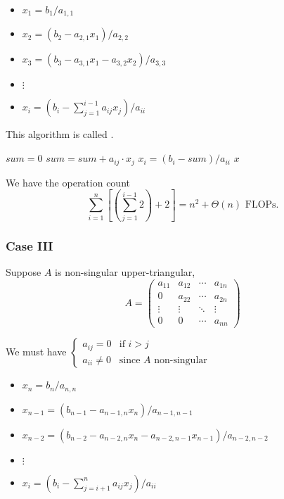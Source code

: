 \begin{itemize}
    \item \( x_1 = b_1 / a_{1,1} \)
    \item \( x_2 = (b_2 - a_{2,1} x_1) / a_{2,2} \)
    \item \( x_3 = (b_3 - a_{3,1} x_1 - a_{3,2} x_2) / a_{3,3} \)
    \item \( \vdots \)
    \item \( \displaystyle x_i = \left( b_i - \sum_{j=1}^{i-1} a_{ij} x_j \right) / a_{ii} \)
\end{itemize}

This algorithm is called .

\begin{algorithm}[H]
    \begin{algorithmic}
        \State \( sum = 0 \)
        \State \( sum = sum + a_{ij} \cdot x_j \)
        \EndFor
        \State \( x_i = (b_i - sum) / a_{ii} \)
        \EndFor
        \State \Return \( x \)
        \EndFunction
    \end{algorithmic}
\end{algorithm}

We have the operation count \[
    \sum_{i=1}^n \left[ \left( \sum_{j=1}^{i-1} 2 \right) + 2 \right] = n^2 + \Theta(n) \text{ FLOPs}.
\]

\subsubsection{Case III}

Suppose \( A \) is non-singular upper-triangular, \[
    A = \begin{pmatrix}
        a_{11} & a_{12} & \cdots & a_{1n} \\
        0      & a_{22} & \cdots & a_{2n} \\
        \vdots & \vdots & \ddots & \vdots \\
        0      & 0      & \cdots & a_{nn}
    \end{pmatrix}
\]

We must have \( \begin{cases}
    a_{ij} = 0    & \text{if } i > j                     \\
    a_{ii} \neq 0 & \text{since } A \text{ non-singular}
\end{cases} \)

\begin{itemize}
    \item \( x_n = b_n / a_{n,n} \)
    \item \( x_{n-1} = (b_{n-1} - a_{n-1,n} x_n) / a_{n-1,n-1} \)
    \item \( x_{n-2} = (b_{n-2} - a_{n-2,n} x_n - a_{n-2,n-1} x_{n-1}) / a_{n-2,n-2} \)
    \item \( \vdots \)
    \item \( \displaystyle x_i = \left( b_i - \sum_{j=i+1}^{n} a_{ij} x_j \right) / a_{ii} \)
\end{itemize}

